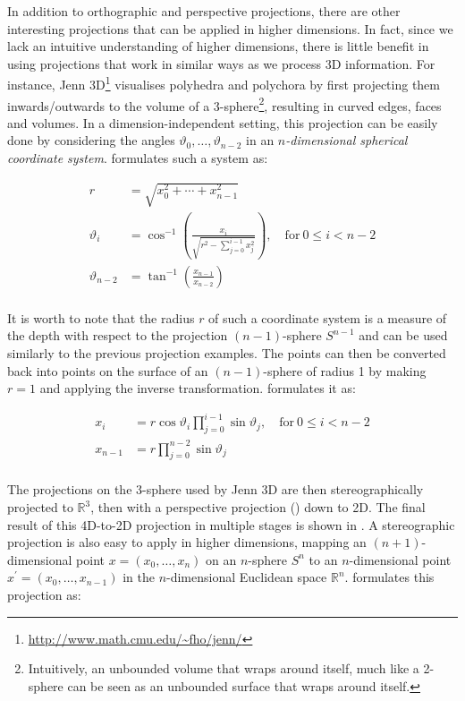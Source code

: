 In addition to orthographic and perspective projections, there are other interesting projections that can be applied in higher dimensions.
In fact, since we lack an intuitive understanding of higher dimensions, there is little benefit in using projections that work in similar ways as we process 3D information.
For instance, Jenn 3D\footnote{\url{http://www.math.cmu.edu/~fho/jenn/}} visualises polyhedra and polychora by first projecting them inwards/outwards to the volume of a 3-sphere\footnote{Intuitively, an unbounded volume that wraps around itself, much like a 2-sphere can be seen as an unbounded surface that wraps around itself.}, resulting in curved edges, faces and volumes.
In a dimension-independent setting, this projection can be easily done by considering the angles $\vartheta_0, \ldots, \vartheta_{n-2}$ in an \emph{$n$-dimensional spherical coordinate system}.
\citet[\S{}12.2]{Steeb11} formulates such a system as:


\begin{align*}
r &= \sqrt{x_0^2 + \cdots + x_{n-1}^2} \\
\vartheta_i &= \cos^{-1} \left( \frac{x_i}{\sqrt{r^2 - \sum_{j=0}^{i-1} x_j^2}} \right), \mathrm{\quad{}for\ } 0 \leq i < n-2 \\
\vartheta_{n-2} &= \tan^{-1} \left( \frac{x_{n-1}}{x_{n-2}} \right) \\
\end{align*}

It is worth to note that the radius $r$ of such a coordinate system is a measure of the depth with respect to the projection $(n-1)$-sphere $S^{n-1}$ and can be used similarly to the previous projection examples.
The points can then be converted back into points on the surface of an $(n-1)$-sphere of radius 1 by making $r = 1$ and applying the inverse transformation.
\citet[\S{}12.2]{Steeb11} formulates it as:

\begin{align*}
x_i &= r \cos \vartheta_i \prod_{j=0}^{i-1} \sin \vartheta_j, \mathrm{\quad{}for\ } 0 \leq i < n-2 \\
x_{n-1} &= r \prod_{j=0}^{n-2} \sin \vartheta_j \\
\end{align*}

The projections on the 3-sphere used by Jenn 3D are then stereographically projected to $\mathbb{R}^3$, then with a perspective projection () down to 2D.
The final result of this 4D-to-2D projection in multiple stages is shown in .
A stereographic projection is also easy to apply in higher dimensions, mapping an $(n+1)$-dimensional point $x = (x_0, \ldots, x_n)$ on an $n$-sphere $S^n$ to an $n$-dimensional point $x^\prime = (x_0, \ldots, x_{n-1})$ in the $n$-dimensional Euclidean space $\mathbb{R}^n$.
\citet{Chisholm00} formulates this projection as:

